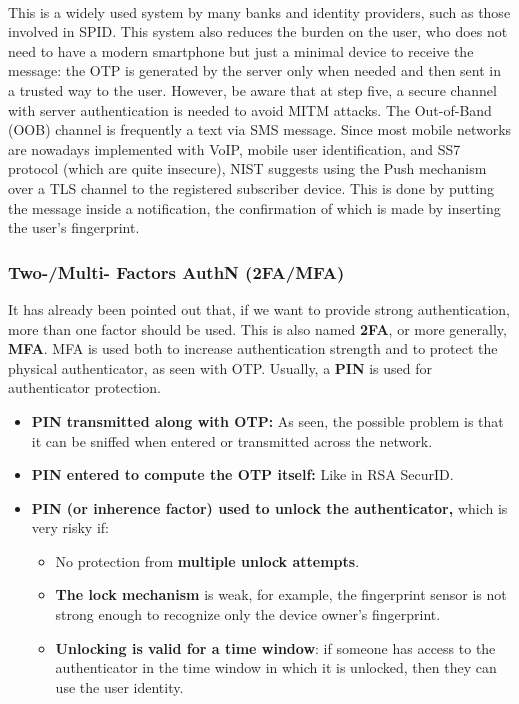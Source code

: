 \paragraph{}
This is a widely used system by many banks and identity providers, such as those involved in SPID. This system also reduces the burden on the user, who does not need to have a modern smartphone but just a minimal device to receive the message: the OTP is generated by the server only when needed and then sent in a trusted way to the user. However, be aware that at step five, a secure channel with server authentication is needed to avoid MITM attacks. The Out-of-Band (OOB) channel is frequently a text via SMS message. Since most mobile networks are nowadays implemented with VoIP, mobile user identification, and SS7 protocol (which are quite insecure), NIST suggests using the Push mechanism over a TLS channel to the registered subscriber device. This is done by putting the message inside a notification, the confirmation of which is made by inserting the user's fingerprint.


\subsubsection{Two-/Multi- Factors AuthN (2FA/MFA)}
It has already been pointed out that, if we want to provide strong authentication, more than one factor should be used. This is also named \textbf{2FA}, or more generally, \textbf{MFA}. MFA is used both to increase authentication strength and to protect the physical authenticator, as seen with OTP. Usually, a \textbf{PIN} is used for authenticator protection.
\begin{itemize}
	\item \textbf{PIN transmitted along with OTP:} As seen, the possible problem is that it can be sniffed when entered or transmitted across the network.
	\item \textbf{PIN entered to compute the OTP itself:} Like in RSA SecurID.
	\item \textbf{PIN (or inherence factor) used to unlock the authenticator,} which is very risky if:
	      \begin{itemize}
		      \item No protection from \textbf{multiple unlock attempts}.
		      \item \textbf{The lock mechanism} is weak, for example, the fingerprint sensor is not strong enough to recognize only the device owner's fingerprint.
		      \item \textbf{Unlocking is valid for a time window}: if someone has access to the authenticator in the time window in which it is unlocked, then they can use the user identity.
	      \end{itemize}
\end{itemize}

